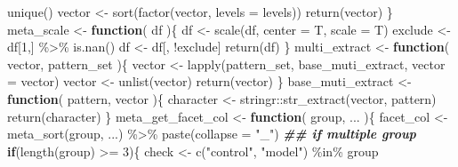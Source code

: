 \documentclass[
]{article}
\newenvironment{Shaded}{\begin{snugshade}}{\end{snugshade}}
\newcommand{\AttributeTok}[1]{\textcolor[rgb]{0.77,0.63,0.00}{#1}}
\newcommand{\ControlFlowTok}[1]{\textcolor[rgb]{0.13,0.29,0.53}{\textbf{#1}}}
\newcommand{\DecValTok}[1]{\textcolor[rgb]{0.00,0.00,0.81}{#1}}
\newcommand{\DocumentationTok}[1]{\textcolor[rgb]{0.56,0.35,0.01}{\textbf{\textit{#1}}}}
\newcommand{\FunctionTok}[1]{\textcolor[rgb]{0.00,0.00,0.00}{#1}}
\newcommand{\NormalTok}[1]{#1}
\newcommand{\OtherTok}[1]{\textcolor[rgb]{0.56,0.35,0.01}{#1}}
\newcommand{\SpecialCharTok}[1]{\textcolor[rgb]{0.00,0.00,0.00}{#1}}
\newcommand{\StringTok}[1]{\textcolor[rgb]{0.31,0.60,0.02}{#1}}
\begin{document}
\begin{Shaded}
\begin{Highlighting}[]
      \FunctionTok{unique}\NormalTok{()}
\NormalTok{    vector }\OtherTok{\textless{}{-}} \FunctionTok{sort}\NormalTok{(}\FunctionTok{factor}\NormalTok{(vector, }\AttributeTok{levels =}\NormalTok{ levels))}
    \FunctionTok{return}\NormalTok{(vector)}
\NormalTok{  \}}
\NormalTok{meta\_scale }\OtherTok{\textless{}{-}} 
  \ControlFlowTok{function}\NormalTok{(}
\NormalTok{           df}
\NormalTok{           )\{}
\NormalTok{    df }\OtherTok{\textless{}{-}} \FunctionTok{scale}\NormalTok{(df, }\AttributeTok{center =}\NormalTok{ T, }\AttributeTok{scale =}\NormalTok{ T)}
\NormalTok{    exclude }\OtherTok{\textless{}{-}}\NormalTok{ df[}\DecValTok{1}\NormalTok{,] }\SpecialCharTok{\%\textgreater{}\%}
      \FunctionTok{is.nan}\NormalTok{()}
\NormalTok{    df }\OtherTok{\textless{}{-}}\NormalTok{ df[, }\SpecialCharTok{!}\NormalTok{exclude]}
    \FunctionTok{return}\NormalTok{(df)}
\NormalTok{  \}}
\NormalTok{multi\_extract }\OtherTok{\textless{}{-}} 
  \ControlFlowTok{function}\NormalTok{(}
\NormalTok{           vector,}
\NormalTok{           pattern\_set}
\NormalTok{           )\{}
\NormalTok{    vector }\OtherTok{\textless{}{-}} \FunctionTok{lapply}\NormalTok{(pattern\_set, base\_muti\_extract,}
                     \AttributeTok{vector =}\NormalTok{ vector)}
\NormalTok{    vector }\OtherTok{\textless{}{-}} \FunctionTok{unlist}\NormalTok{(vector)}
    \FunctionTok{return}\NormalTok{(vector)}
\NormalTok{  \}}
\NormalTok{base\_muti\_extract }\OtherTok{\textless{}{-}}
  \ControlFlowTok{function}\NormalTok{(}
\NormalTok{           pattern,}
\NormalTok{           vector}
\NormalTok{           )\{}
\NormalTok{    character }\OtherTok{\textless{}{-}}\NormalTok{ stringr}\SpecialCharTok{::}\FunctionTok{str\_extract}\NormalTok{(vector, pattern)}
    \FunctionTok{return}\NormalTok{(character)}
\NormalTok{  \}}
\NormalTok{meta\_get\_facet\_col }\OtherTok{\textless{}{-}} 
  \ControlFlowTok{function}\NormalTok{(}
\NormalTok{           group,}
\NormalTok{           ...}
\NormalTok{           )\{}
\NormalTok{    facet\_col }\OtherTok{\textless{}{-}} \FunctionTok{meta\_sort}\NormalTok{(group, ...) }\SpecialCharTok{\%\textgreater{}\%}
      \FunctionTok{paste}\NormalTok{(}\AttributeTok{collapse =} \StringTok{"\_"}\NormalTok{)}
    \DocumentationTok{\#\# if multiple group}
    \ControlFlowTok{if}\NormalTok{(}\FunctionTok{length}\NormalTok{(group) }\SpecialCharTok{\textgreater{}=} \DecValTok{3}\NormalTok{)\{}
\NormalTok{      check }\OtherTok{\textless{}{-}} \FunctionTok{c}\NormalTok{(}\StringTok{"control"}\NormalTok{, }\StringTok{"model"}\NormalTok{) }\SpecialCharTok{\%in\%}\NormalTok{ group}

\end{Highlighting}
\end{Shaded}
\end{document}

